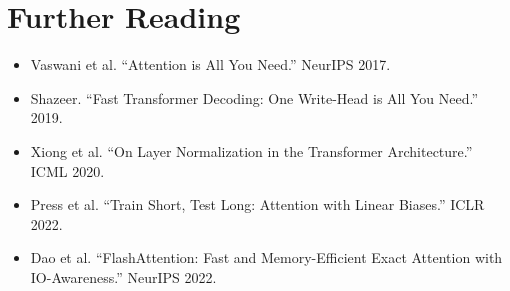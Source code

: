 \documentclass{article}
\begin{document}
\section*{Further Reading}
\begin{itemize}
  \item Vaswani et al. ``Attention is All You Need.'' NeurIPS 2017.
  \item Shazeer. ``Fast Transformer Decoding: One Write-Head is All You Need.'' 2019.
  \item Xiong et al. ``On Layer Normalization in the Transformer Architecture.'' ICML 2020.
  \item Press et al. ``Train Short, Test Long: Attention with Linear Biases.'' ICLR 2022.
  \item Dao et al. ``FlashAttention: Fast and Memory-Efficient Exact Attention with IO-Awareness.'' NeurIPS 2022.
\end{itemize}
\end{document}
